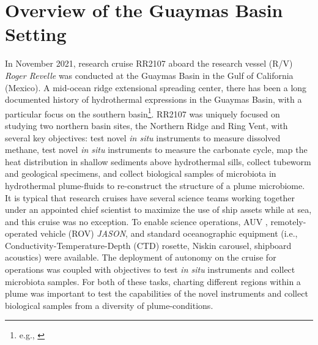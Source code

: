 \section{Overview of the Guaymas Basin Setting}
\label{sec:guaymas_description}
In November 2021, research cruise RR2107 aboard the research vessel (R/V) \emph{Roger Revelle} was conducted at the Guaymas Basin in the Gulf of California (Mexico). A mid-ocean ridge extensional spreading center, there has been a long documented history of hydrothermal expressions in the Guaymas Basin, with a particular focus on the southern basin\footnote{e.g., \autocite{ondreas2018recent, teske2016guaymas, seewald1994variations, von1985chemistry, lonsdale1985hydrothermal}}. RR2107 was uniquely focused on studying two northern basin sites, the Northern Ridge and Ring Vent, with several key objectives: test novel \emph{in situ} instruments to measure dissolved methane\autocite{kapit2021dissolved,kapit2021measurement,michel2022gas}, test novel \emph{in situ} instruments to measure the carbonate cycle, map the heat distribution in shallow sediments above hydrothermal sills, collect tubeworm and geological specimens, and collect biological samples of microbiota in hydrothermal plume-fluids to re-construct the structure of a plume microbiome. It is typical that research cruises have several science teams working together under an appointed chief scientist to maximize the use of ship assets while at sea, and this cruise was no exception. To enable science operations, AUV \Sentry, remotely-operated vehicle (ROV) \emph{JASON}, and standard oceanographic equipment (i.e., Conductivity-Temperature-Depth (CTD) rosette, Niskin carousel, shipboard acoustics) were available. The deployment of autonomy on the cruise for \Sentry operations was coupled with objectives to test \emph{in situ} instruments and collect microbiota samples. For both of these tasks, charting different regions within a plume was important to test the capabilities of the novel instruments and collect biological samples from a diversity of plume-conditions.


